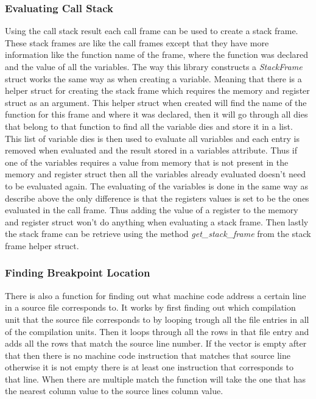 \subsubsection{Evaluating Call Stack}
Using the call stack result each call frame can be used to create a stack frame.
These stack frames are like the call frames except that they have more information like the function name of the frame, where the function was declared and the value of all the variables.
The way this library  constructs a \emph{StackFrame} struct works the same way as when creating a variable.
Meaning that there is a helper struct for creating the stack frame which requires the memory and register struct as an argument.
This helper struct when created will find the name of the function for this frame and where it was declared, then it will go through all dies that belong to that function to find all the variable dies and store it in a list.
This list of variable dies is then used to evaluate all variables and each entry is removed when evaluated and the result stored in a variables attribute.
Thus if one of the variables requires a value from memory that is not present in the memory and register struct then all the variables already evaluated doesn't need to be evaluated again.
The evaluating of the variables is done in the same way as describe above the only difference is that the registers values is set to be the ones evaluated in the call frame.
Thus adding the value of a register to the memory and register struct won't do anything when evaluating a stack frame.
Then lastly the stack frame can be retrieve using the method \emph{get\_stack\_frame} from the stack frame helper struct.


\subsubsection{Finding Breakpoint Location}
There is also a function for finding out what machine code address a certain line in a source file corresponds to.
It works by first finding out which compilation unit that the source file corresponds to by looping trough all the file entries in all of the compilation units. 
Then it loops through all the rows in that file entry and adds all the rows that match the source line number.
If the vector is empty after that then there is no machine code instruction that matches that source line otherwise it is not empty there is at least one instruction that corresponds to that line.
When there are multiple match the function will take the one that has the nearest column value to the source lines column value.

